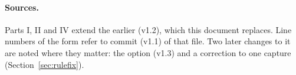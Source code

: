 \paragraph{Sources.} Parts I, II and IV extend the earlier  (v1.2), which this
document replaces. Line numbers of the form  refer to commit  (v1.1) of that
file. Two later changes to it are noted where they matter: the option  (v1.3) and a
correction to one capture (Section~\ref{sec:rulefix}).
